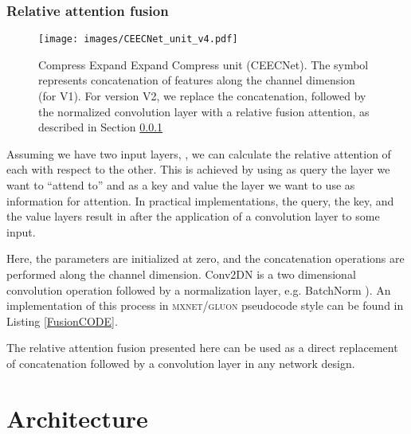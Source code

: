 \documentclass[times, 5p]{elsarticle}
\begin{document}
\subsubsection{Relative attention fusion}
\label{relative_attention_section}



\begin{figure}
\centering
\texttt{[image: images/CEECNet\_unit\_v4.pdf]}
\caption{Compress Expand Expand Compress unit (CEECNet). The symbol  represents concatenation of features  along the channel dimension (for V1).  For version V2, we replace the concatenation,  followed by the normalized convolution layer with a relative fusion attention, as described in Section \ref{relative_attention_section}} 
\label{ceecnet_unit_v4}
\end{figure}


Assuming we have two input layers, , we can calculate the relative attention of each with respect to the other. This is achieved by using as query the layer we want to ``attend to'' and as a key and value the layer we want to use as information for attention. 
In practical implementations, the query, the key, and the value layers result in after the application of a convolution layer to some input.

Here, the  parameters are initialized at zero, and the concatenation operations are performed along the channel dimension. Conv2DN is a two dimensional convolution operation followed by a normalization layer, e.g. BatchNorm \citep{DBLP:journals/corr/IoffeS15}). An implementation of this process in \textsc{mxnet/gluon} pseudocode style can be found in Listing \ref{FusionCODE}. 


The relative attention fusion presented here can be used as  a direct replacement of concatenation followed by a convolution layer in any network design. 






\section{Architecture}
\label{section_architecture}
\end{document}
